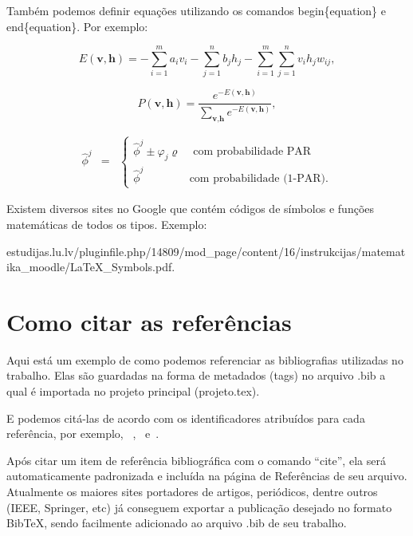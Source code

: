 Também podemos definir equações utilizando os comandos begin\{equation\} e end\{equation\}. Por exemplo:

\begin{equation}
\label{e.energy-rbm}
E(\textbf{v},\textbf{h})=-\sum_{i=1}^ma_iv_i-\sum_{j=1}^nb_jh_j-\sum_{i=1}^m\sum_{j=1}^nv_ih_jw_{ij},
\end{equation}

\begin{equation}
\label{e.probability-configuration}
P(\textbf{v},\textbf{h})=\frac{e^{-E(\textbf{v},\textbf{h})}}{\displaystyle\sum_{\textbf{v},\textbf{h}}e^{-E(\textbf{v},\textbf{h})}},
\end{equation}

\begin{eqnarray}
\label{eq:par}
\hat{\phi}^j & = & \left\{ \begin{array}{ll} \hat{\phi}^j\pm \varphi_j \varrho  & \mbox{{ com probabilidade PAR}} \\
    \hat{\phi}^j & \mbox{{com probabilidade (1-PAR).}}
\end{array}\right.
\end{eqnarray}

Existem diversos sites no Google que contém códigos de símbolos e funções matemáticas de todos os tipos. Exemplo:\\
\begin{center}
\tiny estudijas.lu.lv/pluginfile.php/14809/mod\_page/content/16/instrukcijas/matematika\_moodle/LaTeX\_Symbols.pdf.
\end{center}

\section{Como citar as referências}
\label{ss.referencias}

Aqui está um exemplo de como podemos referenciar as bibliografias utilizadas no trabalho. Elas são guardadas na forma de metadados (tags) no arquivo .bib a qual é importada no projeto principal (projeto.tex).

E podemos citá-las de acordo com os identificadores atribuídos para cada referência, por exemplo,~\cite{stonebraker93} ,~\cite{rocha09} e~\cite{keras}.

Após citar um item de referência bibliográfica com o comando ``cite'', ela será automaticamente padronizada e incluída na página de Referências de seu arquivo. Atualmente os maiores sites portadores de artigos, periódicos, dentre outros (IEEE, Springer, etc) já conseguem exportar a publicação desejado no formato BibTeX, sendo facilmente adicionado ao arquivo .bib de seu trabalho.

